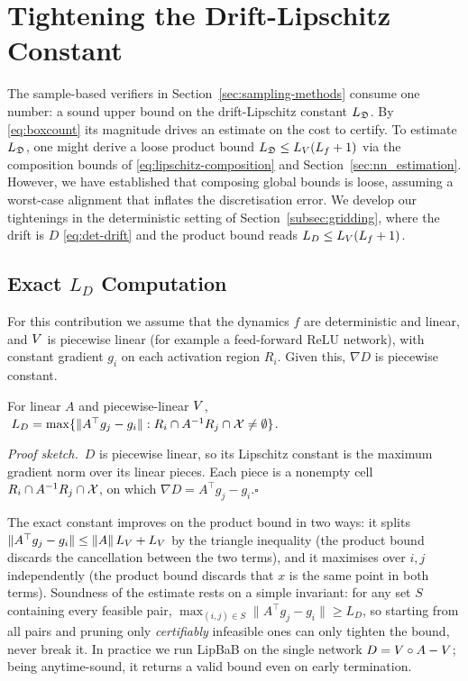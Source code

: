 \section{Tightening the Drift-Lipschitz Constant}
\label{sec:tightdrift}

The sample-based verifiers in Section~\ref{sec:sampling-methods} consume one number: a sound upper bound on the drift-Lipschitz constant $L_{\mathfrak{D}}$. By \eqref{eq:boxcount} its magnitude drives an estimate on the cost to certify. To estimate $L_{\mathfrak{D}}$, one might derive a loose product bound $L_{\mathfrak{D}} \le L_V(L_f+1)$ via the composition bounds of \eqref{eq:lipschitz-composition} and Section~\ref{sec:nn_estimation}. However, we have established that composing global bounds is loose, assuming a worst-case alignment that inflates the discretisation error. We develop our tightenings in the deterministic setting of Section~\ref{subsec:gridding}, where the drift is $D$ \eqref{eq:det-drift} and the product bound reads $L_D \le L_V(L_f+1)$.

\subsection{Exact $L_D$ Computation}

For this contribution we assume that the dynamics $f$ are deterministic and linear, and $V$ is piecewise linear (for example a feed-forward $\mathrm{ReLU}$ network), with constant gradient $g_i$ on each activation region $R_i$. Given this, $\nabla D$ is piecewise constant.

\begin{proposition}
\label{prop:exactLD}
For linear $A$ and piecewise-linear $V$,
$\;L_D=\max\{\|A^\top g_j-g_i\| : R_i\cap A^{-1}R_j\cap\mathcal{X}\neq\emptyset\}$.
\end{proposition}
\medskip\noindent\emph{Proof sketch.}\ $D$ is piecewise linear, so its Lipschitz constant is the maximum gradient norm over its linear pieces. Each piece is a nonempty cell $R_i\cap A^{-1}R_j\cap\mathcal{X}$, on which $\nabla D=A^\top g_j-g_i$.\hfill$\square$\medskip

The exact constant improves on the product bound in two ways: it splits $\|A^\top g_j-g_i\|\le\|A\|\,L_V+L_V$ by the triangle inequality (the product bound discards the cancellation between the two terms), and it maximises over $i,j$ independently (the product bound discards that $x$ is the same point in both terms). Soundness of the estimate rests on a simple invariant: for any set $S$ containing every feasible pair, $\max_{(i,j)\in S}\|A^\top g_j-g_i\|\ge L_D$, so starting from all pairs and pruning only \emph{certifiably} infeasible ones can only tighten the bound, never break it. In practice we run LipBaB on the single network $D=V\circ A-V$; being anytime-sound, it returns a valid bound even on early termination.

